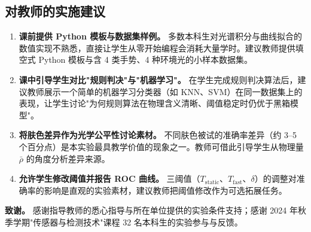 \documentclass[11pt,a4paper]{ctexart}
\begin{document}
\subsection{对教师的实施建议}

\begin{enumerate}[label=(\arabic*),leftmargin=2.2em]
  \item \textbf{课前提供 Python 模板与数据集样例。} 多数本科生对光谱积分与曲线拟合的数值实现不熟悉，直接让学生从零开始编程会消耗大量学时。建议教师提供填空式 Python 模板与含 4 类手势、4 种环境光的小样本数据集。
  \item \textbf{课中引导学生对比"规则判决"与"机器学习"。} 在学生完成规则判决算法后，建议教师展示一个简单的机器学习分类器（如 KNN、SVM）在同一数据集上的表现，让学生讨论"为何规则算法在物理含义清晰、阈值稳定时仍优于黑箱模型"。
  \item \textbf{将肤色差异作为光学公平性讨论素材。} 不同肤色被试的准确率差异（约 3--5 个百分点）是本实验最具教学价值的现象之一。教师可借此引导学生从物理量 $\bar{\rho}$ 的角度分析差异来源。
  \item \textbf{允许学生修改阈值并报告 ROC 曲线。} 三阈值（$T_{\mathrm{static}}$、$T_{\mathrm{fast}}$、$\delta$）的调整对准确率的影响是直观的实验素材，建议教师把阈值修改作为可选拓展任务。
\end{enumerate}

\vspace{0.5em}
\noindent\textbf{致谢。} 感谢指导教师的悉心指导与所在单位提供的实验条件支持；感谢 2024 年秋季学期"传感器与检测技术"课程 32 名本科生的实验参与与反馈。



\end{document}

